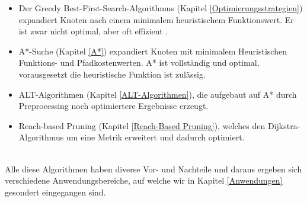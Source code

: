 \begin{itemize}
\begin{itemize}
        \item Der Greedy Best-First-Search-Algorithmus (Kapitel \ref{Optimierungsstrategien}) expandiert Knoten nach einem minimalem heuristischem Funktionswert. Er ist zwar nicht optimal, aber oft effizient \cite{Russell:10d}.
        \item A*-Suche (Kapitel \ref{A*}) expandiert Knoten mit minimalem Heuristischen Funktions- und Pfadkostenwerten. A* ist vollständig und optimal, vorausgesetzt die heuristische Funktion ist zulässig.
        \item ALT-Algorithmen (Kapitel \ref{ALT-Algorithmen}), die aufgebaut auf A* durch Preprocessing noch optimiertere Ergebnisse erzeugt.
        \item Reach-based Pruning (Kapitel \ref{Reach-Based Pruning}), welches den Dijkstra-Algorithmus um eine Metrik erweitert und dadurch optimiert.
    \end{itemize}
\end{itemize}
\noindent \\
Alle diese Algorithmen haben diverse Vor- und Nachteile und daraus ergeben sich verschiedene 
Anwendungsbereiche, auf welche wir in Kapitel \ref{Anwendungen} gesondert eingegangen sind.
